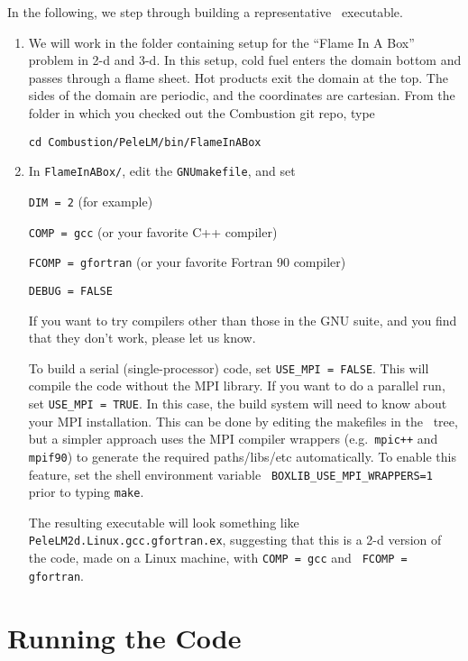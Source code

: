 In the following, we step through building a representative \pelelm\ executable.
\begin{enumerate}
\item We will work in the folder containing setup for the ``Flame In A Box'' problem in 2-d and 3-d.
In this setup, cold fuel enters the domain bottom and passes through a flame sheet.
Hot products exit the domain at the top.  The sides of the domain are periodic, and the coordinates are
cartesian. From the folder in which you checked out the {\sf Combustion} git repo,
  type
\begin{verbatim}
cd Combustion/PeleLM/bin/FlameInABox
\end{verbatim}

\item In {\tt FlameInABox/}, edit the {\tt GNUmakefile}, and set

{\tt DIM = 2} (for example)

{\tt COMP = gcc} (or your favorite C++ compiler)

{\tt FCOMP = gfortran} (or your favorite Fortran 90 compiler)

{\tt DEBUG = FALSE}

If you want to try compilers other than those in the GNU suite, and you find that they don't
work, please let us know.

To build a serial (single-processor) code, set {\tt USE\_MPI = FALSE}.
This will compile the code without the MPI library.  If you want to do
a parallel run, set {\tt USE\_MPI = TRUE}.  In this
case, the build system will need to know about your MPI installation.
This can be done by editing the makefiles in the \amrex\ tree, but a
simpler approach uses the MPI compiler wrappers
(e.g.\ {\tt mpic++} and {\tt mpif90}) to generate the 
required paths\slash libs\slash etc automatically.  To enable this
feature, set the shell environment variable {\tt
  BOXLIB\_USE\_MPI\_WRAPPERS=1} prior to typing {\tt make}.

  The resulting executable will look something like {\tt
    PeleLM2d.Linux.gcc.gfortran.ex}, suggesting that this is a 2-d version
  of the code, made on a Linux machine, with {\tt COMP = gcc} and {\tt
    FCOMP = gfortran}.

\end{enumerate}

\section{Running the Code}


